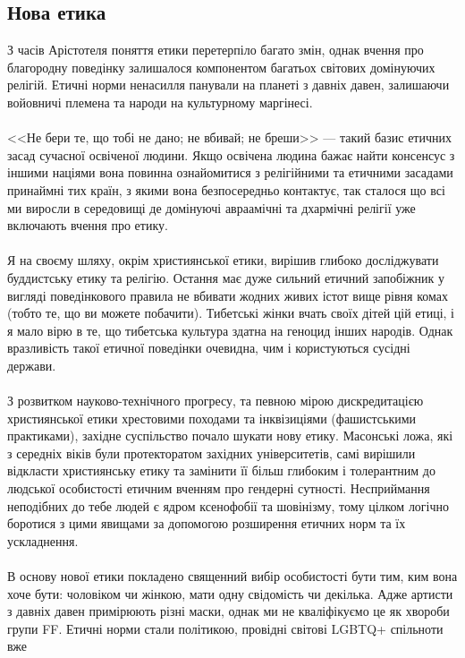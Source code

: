 \newpage
\subsection{Нова етика}

З часів Арістотеля поняття етики перетерпіло багато змін, однак вчення про
благородну поведінку залишалося компонентом багатьох світових домінуючих
релігій. Етичні норми ненасилля панували на планеті з давніх давен,
залишаючи войовничі племена та народи на культурному маргінесі.
\\
\\
<<Не бери те, що тобі не дано; не вбивай; не бреши>> --- такий базис
етичних засад сучасної освіченої людини. Якщо освічена людина бажає
найти консенсус з іншими націями вона повинна ознайомитися з релігійними
та етичними засадами принаймні тих країн, з якими вона безпосередньо контактує,
так сталося що всі ми виросли в середовищі де домінуючі авраамічні та дхармічні
релігії уже включають вчення про етику.
\\
\\
Я на своєму шляху, окрім християнської етики, вирішив глибоко досліджувати
буддистську етику та релігію. Остання має дуже сильний етичний запобіжник
у вигляді поведінкового правила не вбивати жодних живих істот вище рівня
комах (тобто те, що ви можете побачити). Тибетські жінки вчать своїх дітей
цій етиці, і я мало вірю в те, що тибетська культура здатна на геноцид інших
народів. Однак вразливість такої етичної поведінки очевидна, чим і користуються сусідні держави.
\\
\\
З розвитком науково-технічного прогресу, та певною мірою дискредитацією
християнської етики хрестовими походами та інквізиціями (фашистськими
практиками), західне суспільство почало шукати нову етику.
Масонські ложа, які з середніх віків були протекторатом західних університетів,
самі вирішили відкласти християнську етику та замінити її більш глибоким і
толерантним до людської особистості етичним вченням про гендерні сутності.
Несприймання неподібних до тебе людей є ядром ксенофобії та шовінізму, тому
цілком логічно боротися з цими явищами за допомогою розширення етичних норм
та їх ускладнення.
\\
\\
В основу нової етики покладено священний вибір особистості бути тим, ким вона
хоче бути: чоловіком чи жінкою, мати одну свідомість чи декілька. Адже артисти
з давніх давен примірюють різні маски, однак ми не кваліфікуємо це як хвороби
групи FF. Етичні норми стали політикою, провідні світові LGBTQ+ спільноти вже
